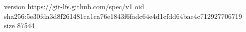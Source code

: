version https://git-lfs.github.com/spec/v1
oid sha256:5e30fda3d8f261481ca1ca76e1843f6fadc64e4d1cfdd64bae4c712927706719
size 87544
